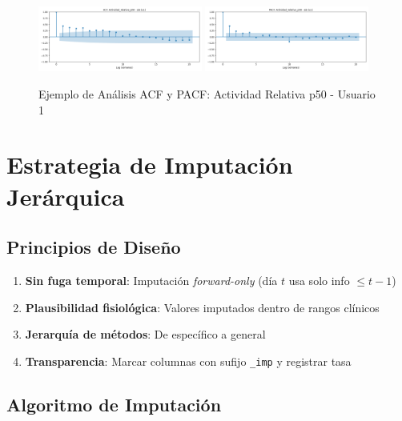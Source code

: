 \documentclass[12pt,letterpaper,twoside]{report}
\begin{document}
\begin{figure}[H]
\centering
\includegraphics[width=0.48\textwidth]{figuras/acf_Actividad_relativa_p50_u1.png}
\includegraphics[width=0.48\textwidth]{figuras/pacf_Actividad_relativa_p50_u1.png}
\caption{Ejemplo de Análisis ACF y PACF: Actividad Relativa p50 - Usuario 1}
\label{fig:acf_pacf_ejemplo}
\end{figure}

\section{Estrategia de Imputación Jerárquica}

\subsection{Principios de Diseño}

\begin{enumerate}[noitemsep]
    \item \textbf{Sin fuga temporal}: Imputación \textit{forward-only} (día $t$ usa solo info $\leq t-1$)
    \item \textbf{Plausibilidad fisiológica}: Valores imputados dentro de rangos clínicos
    \item \textbf{Jerarquía de métodos}: De específico a general
    \item \textbf{Transparencia}: Marcar columnas con sufijo \texttt{\_imp} y registrar tasa
\end{enumerate}

\subsection{Algoritmo de Imputación}
\end{document}
